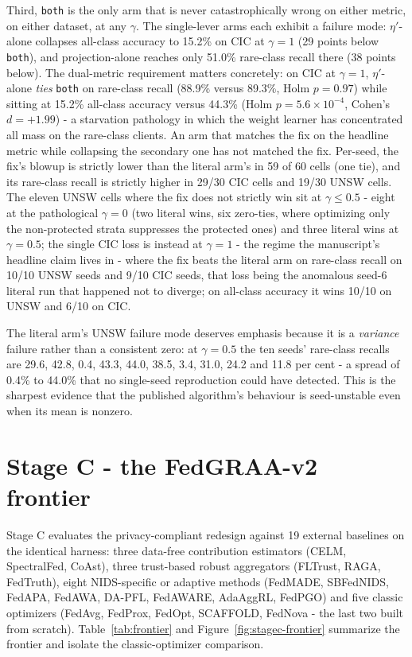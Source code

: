 \documentclass[11pt,a4paper]{report}
\begin{document}
Third, \texttt{both} is the only arm that is never catastrophically wrong on
either metric, on either dataset, at any $\gamma$. The single-lever arms
each exhibit a failure mode: $\eta'$-alone collapses all-class accuracy to
15.2\% on CIC at $\gamma = 1$ (29 points below \texttt{both}), and
projection-alone reaches only 51.0\% rare-class recall there (38 points
below). The dual-metric requirement matters concretely: on CIC at
$\gamma = 1$, $\eta'$-alone \emph{ties} \texttt{both} on rare-class recall
(88.9\% versus 89.3\%, Holm $p = 0.97$) while sitting at 15.2\% all-class
accuracy versus 44.3\% (Holm $p = 5.6 \times 10^{-4}$, Cohen's
$d = +1.99$) - a starvation pathology in which the weight learner has
concentrated all mass on the rare-class clients. An arm that matches the fix
on the headline metric while collapsing the secondary one has not matched
the fix. Per-seed, the fix's blowup is strictly lower than the literal
arm's in 59 of 60 cells (one tie), and its rare-class recall is strictly
higher in 29/30 CIC cells and 19/30 UNSW cells. The eleven UNSW cells where
the fix does not strictly win sit at $\gamma \le 0.5$ - eight at the
pathological $\gamma = 0$ (two literal wins, six zero-ties, where optimizing
only the non-protected strata suppresses the protected ones) and three
literal wins at $\gamma = 0.5$; the single CIC loss is instead at
$\gamma = 1$ - the regime the manuscript's headline claim lives in - where
the fix beats the literal arm on rare-class recall on 10/10 UNSW seeds and
9/10 CIC seeds, that loss being the anomalous seed-6 literal run that
happened not to diverge; on all-class accuracy it wins 10/10 on UNSW and
6/10 on CIC.

The literal arm's UNSW failure mode deserves emphasis because it is a
\emph{variance} failure rather than a consistent zero: at $\gamma = 0.5$
the ten seeds' rare-class recalls are 29.6, 42.8, 0.4, 43.3, 44.0, 38.5,
3.4, 31.0, 24.2 and 11.8 per cent - a spread of 0.4\% to 44.0\% that no
single-seed reproduction could have detected. This is the sharpest
evidence that the published algorithm's behaviour is seed-unstable even
when its mean is nonzero.

\section{Stage C - the FedGRAA-v2 frontier}
\label{sec:stagec}

Stage C evaluates the privacy-compliant redesign against 19 external
baselines on the identical harness: three data-free contribution estimators
(CELM, SpectralFed, CoAst), three trust-based robust aggregators (FLTrust,
RAGA, FedTruth), eight NIDS-specific or adaptive methods (FedMADE,
SBFedNIDS, FedAPA, FedAWA, DA-PFL, FedAWARE, AdaAggRL, FedPGO) and five
classic optimizers (FedAvg, FedProx, FedOpt, SCAFFOLD, FedNova - the last
two built from scratch). Table~\ref{tab:frontier} and
Figure~\ref{fig:stagec-frontier} summarize the frontier and isolate the
classic-optimizer comparison.
\end{document}
